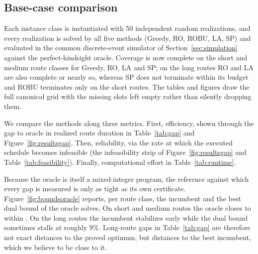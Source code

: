 %
%
%

\subsection{Base-case comparison}
\label{sec:basecase}

Each instance class is instantiated with 50 independent random realizations,
and every realization is solved by all five methods (Greedy, RO, ROBU, LA, SP)
and evaluated in the common discrete-event simulator of
Section~\ref{sec:simulation} against the perfect-hindsight oracle.  Coverage is
now complete on the short and medium route classes for Greedy, RO, LA and SP;
on the long routes RO and LA are also complete or nearly so, whereas SP does
not terminate within its budget and ROBU terminates only on the short routes.
The tables and figures draw the full canonical grid with the missing slots left
empty rather than silently dropping them.

We compare the methods along three metrics.  First, efficiency, shown through
the gap to oracle in realized route duration in Table~\ref{tab:gap} and
Figure~\ref{fig:resultsgap}.  Then, reliability, via the rate at which the
executed schedule becomes infeasible (the infeasibility strip of
Figure~\ref{fig:resultsgap} and Table~\ref{tab:feasibility}).  Finally,
computational effort in Table~\ref{tab:runtime}.

Because the oracle is itself a mixed-integer program, the reference against
which every gap is measured is only as tight as its own certificate.
Figure~\ref{fig:boundsoracle} reports, per route class, the incumbent and the
best dual bound of the oracle solves.  On short and medium routes the oracle
closes to within .  On the long routes the incumbent stabilizes early
while the dual bound sometimes stalls at roughly 9\%.  Long-route gaps in
Table~\ref{tab:gap} are therefore not exact distances to the proved optimum,
but distances to the best incumbent, which we believe to be close to it.

